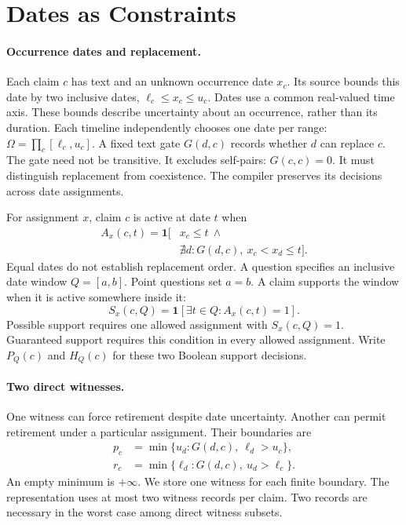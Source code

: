 \section{Dates as Constraints}
\label{sec:theory}

\paragraph{Occurrence dates and replacement.}
Each claim $c$ has text and an unknown occurrence date $x_c$.
Its source bounds this date by two inclusive dates, $\ell_c\leq x_c\leq u_c$.
Dates use a common real-valued time axis.
These bounds describe uncertainty about an occurrence, rather than its duration.
Each timeline independently chooses one date per range:
$\Omega=\prod_c[\ell_c,u_c]$.
A fixed text gate $G(d,c)$ records whether $d$ can replace $c$.
The gate need not be transitive.
It excludes self-pairs: $G(c,c)=0$.
It must distinguish replacement from coexistence.
The compiler preserves its decisions across date assignments.

For assignment $x$, claim $c$ is active at date $t$ when
\begin{equation}
\begin{split}
 A_x(c,t)=\mathbf{1}[&x_c\leq t\ \land\\
 &\nexists d:G(d,c),\ x_c<x_d\leq t].
\end{split}
\label{eq:uncertain-active}
\end{equation}
Equal dates do not establish replacement order.
A question specifies an inclusive date window $Q=[a,b]$.
Point questions set $a=b$.
A claim supports the window when it is active somewhere inside it:
\begin{equation}
 S_x(c,Q)=\mathbf{1}[\exists t\in Q:A_x(c,t)=1].
\end{equation}
Possible support requires one allowed assignment with $S_x(c,Q)=1$.
Guaranteed support requires this condition in every allowed assignment.
Write $P_Q(c)$ and $H_Q(c)$ for these two Boolean support decisions.

\paragraph{Two direct witnesses.}
One witness can force retirement despite date uncertainty.
Another can permit retirement under a particular assignment.
Their boundaries are
\begin{align}
 p_c&=\min\{u_d:G(d,c),\ \ell_d>u_c\},\label{eq:possible-boundary}\\
 r_c&=\min\{\ell_d:G(d,c),\ u_d>\ell_c\}.\label{eq:certain-boundary}
\end{align}
An empty minimum is $+\infty$.
We store one witness for each finite boundary.
The representation uses at most two witness records per claim.
Two records are necessary in the worst case among direct witness subsets.

